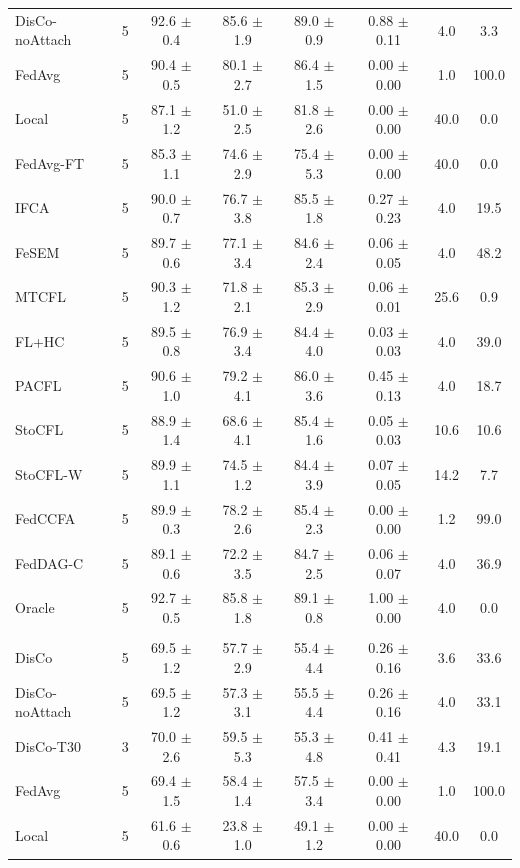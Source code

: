 {\begin{tabular}{l r c c c c c c}
DisCo-noAttach & 5 & 92.6 $\pm$ 0.4 & 85.6 $\pm$ 1.9 & 89.0 $\pm$ 0.9 & 0.88 $\pm$ 0.11 & 4.0 & 3.3 \\
FedAvg & 5 & 90.4 $\pm$ 0.5 & 80.1 $\pm$ 2.7 & 86.4 $\pm$ 1.5 & 0.00 $\pm$ 0.00 & 1.0 & 100.0 \\
Local & 5 & 87.1 $\pm$ 1.2 & 51.0 $\pm$ 2.5 & 81.8 $\pm$ 2.6 & 0.00 $\pm$ 0.00 & 40.0 & 0.0 \\
FedAvg-FT & 5 & 85.3 $\pm$ 1.1 & 74.6 $\pm$ 2.9 & 75.4 $\pm$ 5.3 & 0.00 $\pm$ 0.00 & 40.0 & 0.0 \\
IFCA & 5 & 90.0 $\pm$ 0.7 & 76.7 $\pm$ 3.8 & 85.5 $\pm$ 1.8 & 0.27 $\pm$ 0.23 & 4.0 & 19.5 \\
FeSEM & 5 & 89.7 $\pm$ 0.6 & 77.1 $\pm$ 3.4 & 84.6 $\pm$ 2.4 & 0.06 $\pm$ 0.05 & 4.0 & 48.2 \\
MTCFL & 5 & 90.3 $\pm$ 1.2 & 71.8 $\pm$ 2.1 & 85.3 $\pm$ 2.9 & 0.06 $\pm$ 0.01 & 25.6 & 0.9 \\
FL+HC & 5 & 89.5 $\pm$ 0.8 & 76.9 $\pm$ 3.4 & 84.4 $\pm$ 4.0 & 0.03 $\pm$ 0.03 & 4.0 & 39.0 \\
PACFL & 5 & 90.6 $\pm$ 1.0 & 79.2 $\pm$ 4.1 & 86.0 $\pm$ 3.6 & 0.45 $\pm$ 0.13 & 4.0 & 18.7 \\
StoCFL & 5 & 88.9 $\pm$ 1.4 & 68.6 $\pm$ 4.1 & 85.4 $\pm$ 1.6 & 0.05 $\pm$ 0.03 & 10.6 & 10.6 \\
StoCFL-W & 5 & 89.9 $\pm$ 1.1 & 74.5 $\pm$ 1.2 & 84.4 $\pm$ 3.9 & 0.07 $\pm$ 0.05 & 14.2 & 7.7 \\
FedCCFA & 5 & 89.9 $\pm$ 0.3 & 78.2 $\pm$ 2.6 & 85.4 $\pm$ 2.3 & 0.00 $\pm$ 0.00 & 1.2 & 99.0 \\
FedDAG-C & 5 & 89.1 $\pm$ 0.6 & 72.2 $\pm$ 3.5 & 84.7 $\pm$ 2.5 & 0.06 $\pm$ 0.07 & 4.0 & 36.9 \\
Oracle & 5 & 92.7 $\pm$ 0.5 & 85.8 $\pm$ 1.8 & 89.1 $\pm$ 0.8 & 1.00 $\pm$ 0.00 & 4.0 & 0.0 \\
\addlinespace
\multicolumn{8}{l}{\textit{Office-Home}} \\
DisCo & 5 & 69.5 $\pm$ 1.2 & 57.7 $\pm$ 2.9 & 55.4 $\pm$ 4.4 & 0.26 $\pm$ 0.16 & 3.6 & 33.6 \\
DisCo-noAttach & 5 & 69.5 $\pm$ 1.2 & 57.3 $\pm$ 3.1 & 55.5 $\pm$ 4.4 & 0.26 $\pm$ 0.16 & 4.0 & 33.1 \\
DisCo-T30 & 3 & 70.0 $\pm$ 2.6 & 59.5 $\pm$ 5.3 & 55.3 $\pm$ 4.8 & 0.41 $\pm$ 0.41 & 4.3 & 19.1 \\
FedAvg & 5 & 69.4 $\pm$ 1.5 & 58.4 $\pm$ 1.4 & 57.5 $\pm$ 3.4 & 0.00 $\pm$ 0.00 & 1.0 & 100.0 \\
Local & 5 & 61.6 $\pm$ 0.6 & 23.8 $\pm$ 1.0 & 49.1 $\pm$ 1.2 & 0.00 $\pm$ 0.00 & 40.0 & 0.0 \\

\end{tabular}}
